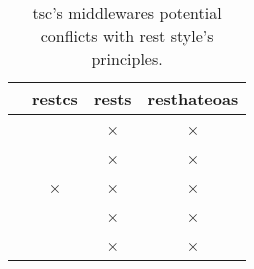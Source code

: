 
\begin{savenotes} %
  \begin{table}[htbp]
    \caption{\ac{tsc}'s middlewares potential conflicts with \ac{rest} style's principles.}
    \centering
    \begin{tabular}{lccc}
	\hline
	&
	\ac{restcs} &
	\ac{rests} &
	\ac{resthateoas} \\
	\hline
	\midtsc{} & & × & × \\
	\midsws{} & & × & × \\
	\midtscpp{} & × & × & × \\
	\midtripcom{} & & × & × \\
	\midsmartmt{} & & × & × \\
	\hline
    \end{tabular}
    \label{tab:rest_principles}
  \end{table}
\end{savenotes}